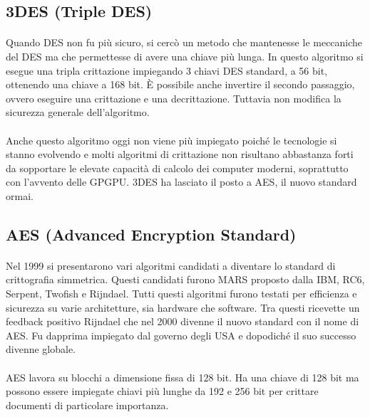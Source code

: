 \documentclass{article}
\begin{document}
		\subsection{3DES (Triple DES)}

			\paragraph{}
			Quando DES non fu più sicuro, si cercò un metodo che mantenesse le meccaniche del DES ma che permettesse di avere una chiave più lunga. In questo algoritmo si esegue una tripla crittazione impiegando 3 chiavi DES standard, a 56 bit, ottenendo una chiave a 168 bit. È possibile anche invertire il secondo passaggio, ovvero eseguire una crittazione e una decrittazione. Tuttavia non modifica la sicurezza generale dell'algoritmo.
			\paragraph{}
			Anche questo algoritmo oggi non viene più impiegato poiché le tecnologie si stanno evolvendo e molti algoritmi di crittazione non risultano abbastanza forti da sopportare le elevate capacità di calcolo dei computer moderni, soprattutto con l'avvento delle GPGPU. 3DES ha lasciato il posto a AES, il nuovo standard ormai.

		\subsection{AES (Advanced Encryption Standard)}

			\paragraph{}
			Nel 1999 si presentarono vari algoritmi candidati a diventare lo standard di crittografia simmetrica. Questi candidati furono MARS proposto dalla IBM, RC6, Serpent, Twofish e Rijndael. Tutti questi algoritmi furono testati per efficienza e sicurezza su varie architetture, sia hardware che software. Tra questi ricevette un feedback positivo Rijndael che nel 2000 divenne il nuovo standard con il nome di AES. Fu dapprima impiegato dal governo degli USA e dopodiché il suo successo divenne globale.
			\paragraph{}
			AES lavora su blocchi a dimensione fissa di 128 bit. Ha una chiave di 128 bit ma possono essere impiegate chiavi più lunghe da 192 e 256 bit per crittare documenti di particolare importanza.
\end{document}

